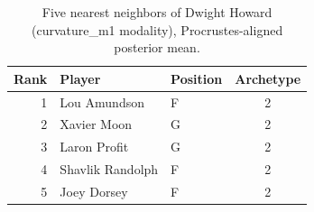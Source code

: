 \begin{table}[htbp]
  \centering\small
  \begin{tabular}{rllc}
    \toprule
    Rank & Player & Position & Archetype \\
    \midrule
    1 & Lou Amundson & F & 2 \\
    2 & Xavier Moon & G & 2 \\
    3 & Laron Profit & G & 2 \\
    4 & Shavlik Randolph & F & 2 \\
    5 & Joey Dorsey & F & 2 \\
    \bottomrule
  \end{tabular}
  \caption{Five nearest neighbors of Dwight Howard (curvature_m1 modality), Procrustes-aligned posterior mean.}
  \label{tab:Dwight_Howard_neighbors_curvature_m1}
\end{table}


